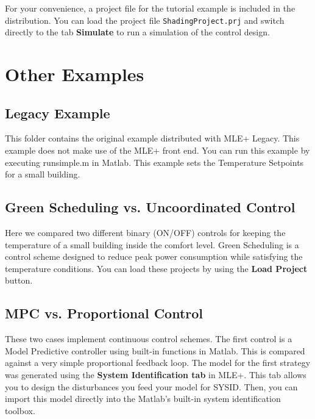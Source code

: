 \documentclass[11pt]{article}
\begin{document}
For your convenience, a project file for the tutorial example is
included in the distribution.  You can load the project file
\texttt{ShadingProject.prj} and switch directly to the tab \textbf{Simulate} to
run a simulation of the control design.




\section{Other Examples}
\label{sec-5}

\subsection{Legacy Example}
\label{sec-5-1}
This folder contains the original example distributed with MLE+ Legacy. This example does
not make use of the MLE+ front end. You can run this example by
executing runsimple.m in Matlab. This example sets the Temperature Setpoints for a small building. 


\subsection{Green Scheduling vs. Uncoordinated Control}
\label{sec-5-2}
Here we compared two different binary (ON/OFF) controls for keeping
the temperature of a small building inside the comfort level. 
Green Scheduling is a control
scheme designed to reduce peak power consumption while satisfying the
temperature conditions. You can load these projects by using the \textbf{Load
Project} button.


\subsection{MPC vs. Proportional Control}
\label{sec-5-3}
These two cases implement continuous control schemes. The first control is a Model 
Predictive controller using built-in functions in
Matlab. This is compared against a very simple proportional feedback
loop. The model for the first strategy was generated using the \textbf{System
Identification tab} in MLE+. This tab allows you to design the disturbances
you feed your model for SYSID. Then, you can import this model directly into the Matlab's built-in
system identification toolbox.  
\end{document}
